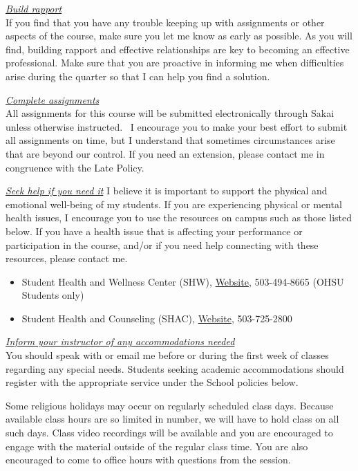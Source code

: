 \documentclass[
  letterpaper,
  DIV=11,
  numbers=noendperiod]{scrartcl}
\begin{document}
\ul{\emph{Build rapport}}\\
If you find that you have any trouble keeping up with assignments or
other aspects of the course, make sure you let me know as early as
possible. As you will find, building rapport and effective relationships
are key to becoming an effective professional. Make sure that you are
proactive in informing me when difficulties arise during the quarter so
that I can help you find a solution.

\ul{\emph{Complete assignments}}\\
All assignments for this course will be submitted electronically through
Sakai unless otherwise instructed.~ I encourage you to make your best
effort to submit all assignments on time, but I understand that
sometimes circumstances arise that are beyond our control. If you need
an extension, please contact me in congruence with the Late Policy.

\ul{\emph{Seek help if you need it}}\textbf{\hfill\break
}I believe it is important to support the physical and emotional
well‐being of my students. If you are experiencing physical or mental
health issues, I encourage you to use the resources on campus such as
those listed below. If you have a health issue that is affecting your
performance or participation in the course, and/or if you need help
connecting with these resources, please contact me.

\begin{itemize}
\item
  Student Health and Wellness Center (SHW),
  \href{https://www.ohsu.edu/education/student-health-and-wellness}{Website},
  503-494-8665 (OHSU Students only)
\item
  Student Health and Counseling (SHAC),
  \href{https://www.pdx.edu/health-counseling/}{Website}, 503-725-2800
\end{itemize}

\ul{\emph{Inform your instructor of any accommodations needed}}\\
You should speak with or email me before or during the first week of
classes regarding any special needs. Students seeking academic
accommodations should register with the appropriate service under the
School policies below.

Some religious holidays may occur on regularly scheduled class days.
Because available class hours are so limited in number, we will have to
hold class on all such days. Class video recordings will be available
and you are encouraged to engage with the material outside of the
regular class time. You are also encouraged to come to office hours with
questions from the session.
\end{document}
